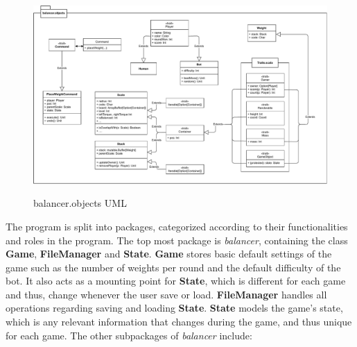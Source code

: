\documentclass[12pt]{article}
\begin{document}
\begin{figure}
  \centering
  \caption{balancer.objects UML}
  \includegraphics[width=\textwidth]{UML2.pdf}
  \label{fig:uml2}
\end{figure}

The program is split into packages, categorized according to their
functionalities and roles in the program. The top most package is
\textit{balancer}, containing the class \textbf{Game}, \textbf{FileManager} and
\textbf{State}. \textbf{Game} stores basic default settings of the game such as
the number of weights per round and the default difficulty of the bot. It also
acts as a mounting point for \textbf{State}, which is different for each game
and thus, change whenever the user save or load.  \textbf{FileManager} handles
all operations regarding saving and loading \textbf{State}. \textbf{State}
models the game's state, which is any relevant information that changes during
the game, and thus unique for each game. The other subpackages of
\textit{balancer} include:
\end{document}
